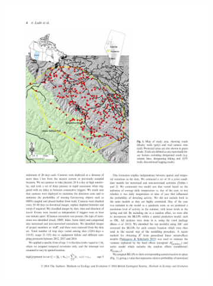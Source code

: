 \documentclass[11pt, titlepage]{article}\usepackage[]{graphicx}\usepackage[]{color}
\begin{document}
\begin{spacing}{1.9}
\begin{flushleft}
\begin{singlespace}
	\begin{figure}
	  \centering
      \begin{subfigure}[b]{0.5\textwidth}
      \centering
      \includegraphics[width=\linewidth]{figure/Fig-LadleStudyArea-1.pdf}
      \caption{}
      \end{subfigure}%
      \begin{subfigure}[b]{0.5\textwidth}
      \centering

\end{subfigure}
\end{figure}
\end{singlespace}
\end{flushleft}
\end{spacing}
\end{document}
